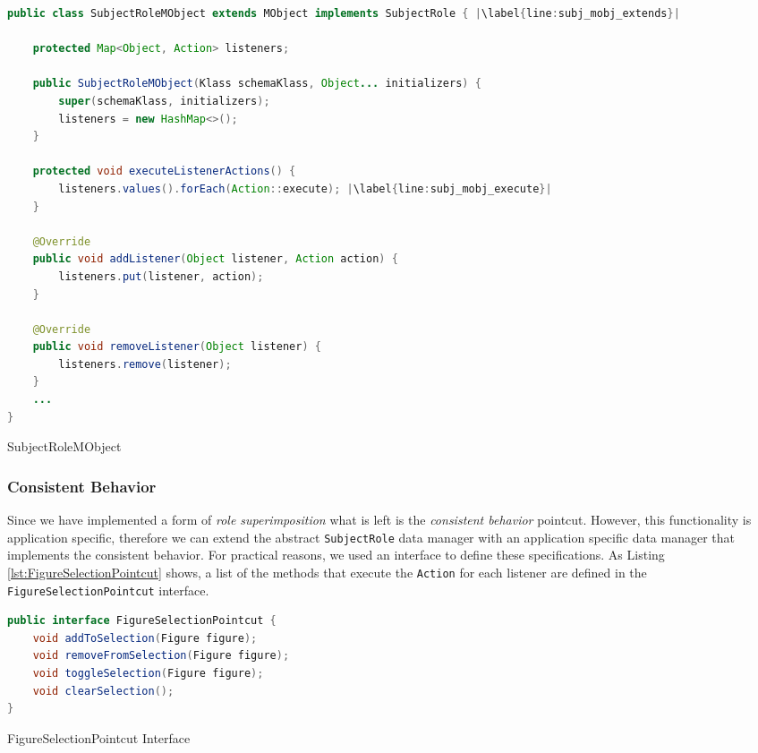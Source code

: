 \begin{sourcecode} [H]
	\begin{lstlisting}[language=Java, escapechar=|]
public class SubjectRoleMObject extends MObject implements SubjectRole { |\label{line:subj_mobj_extends}|

	protected Map<Object, Action> listeners;

	public SubjectRoleMObject(Klass schemaKlass, Object... initializers) {
		super(schemaKlass, initializers);
		listeners = new HashMap<>();
	}

	protected void executeListenerActions() {
		listeners.values().forEach(Action::execute); |\label{line:subj_mobj_execute}|
	}

	@Override
	public void addListener(Object listener, Action action) {
		listeners.put(listener, action);
	}

	@Override
	public void removeListener(Object listener) {
		listeners.remove(listener);
	}
	...
}
	\end{lstlisting}
	\caption{SubjectRoleMObject}
	\label{lst:SubjectRoleMObject}
\end{sourcecode}

\subsubsection{Consistent Behavior}
Since we have implemented a form of \textit{role superimposition} what is left is the \textit{consistent behavior} pointcut.
However, this functionality is application specific, therefore we can extend the abstract \texttt{SubjectRole} data manager with an application specific data manager that implements the consistent behavior.
For practical reasons, we used an interface to define these specifications.
As Listing \ref{lst:FigureSelectionPointcut} shows, a list of the methods that execute the \texttt{Action} for each listener are defined in the \texttt{FigureSelectionPointcut} interface. 

\begin{sourcecode} [H]
	\begin{lstlisting}[language=Java, escapechar=|]
public interface FigureSelectionPointcut {
	void addToSelection(Figure figure);
	void removeFromSelection(Figure figure);
	void toggleSelection(Figure figure);
	void clearSelection();
}
	\end{lstlisting}
	\caption{FigureSelectionPointcut Interface}
	\label{lst:FigureSelectionPointcut}
\end{sourcecode}

